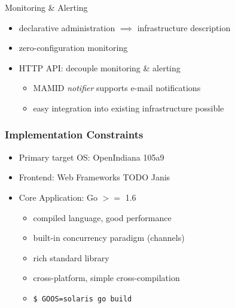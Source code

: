 \documentclass[11pt,aspectratio=169]{beamer}
\begin{document}
    
    \begin{frame}{Monitoring \& Alerting}
        \begin{itemize}
            \item declarative administration $\implies$ infrastructure description
            \item zero-configuration monitoring 
            \item HTTP API: decouple monitoring \& alerting 
            \begin{itemize}
                \item MAMID \textit{notifier} supports e-mail notifications
                \item easy integration into existing infrastructure possible 
            \end{itemize}
        \end{itemize}
    \end{frame}
    
    
    \begin{frame}
        \frametitle{Implementation Constraints}
        \begin{itemize}
            \item<2-> Primary target OS: OpenIndiana 105a9
            \item<3-> Frontend: Web Frameworks TODO Janis %
            \item<4-> Core Application: Go $>=$ 1.6
            \begin{itemize}
                \item<5-> compiled language, good performance
                \item<6-> built-in concurrency paradigm (channels)
                \item<7-> rich standard library
                \item<8-> cross-platform, simple cross-compilation 
                \item<9->\texttt{\$ GOOS=solaris go build}
            \end{itemize}
        \end{itemize}
        
    \end{frame}
        
\end{document}
